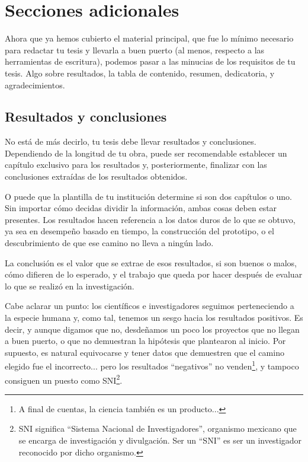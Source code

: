 \chapter{Secciones adicionales}
\label{cha:secciones_adicionales}



Ahora que ya hemos cubierto el material principal, que fue lo mínimo necesario para redactar tu tesis y llevarla a buen puerto (al menos, respecto a las herramientas de escritura), podemos pasar a las minucias de los requisitos de tu tesis. Algo sobre resultados, la tabla de contenido, resumen, dedicatoria, y agradecimientos.



\section{Resultados y conclusiones}
\label{sec:resultados_y_conclusiones}



No está de más decirlo, tu tesis debe llevar resultados y conclusiones. Dependiendo de la longitud de tu obra, puede ser recomendable establecer un capítulo exclusivo para los resultados y, posteriormente, finalizar con las conclusiones extraídas de los resultados obtenidos.

O puede que la plantilla de tu institución determine si son dos capítulos o uno. Sin importar cómo decidas dividir la información, ambas cosas deben estar presentes. Los resultados hacen referencia a los datos duros de lo que se obtuvo, ya sea en desempeño basado en tiempo, la construcción del prototipo, o el descubrimiento de que ese camino no lleva a ningún lado.

La conclusión es el valor que se extrae de esos resultados, si son buenos o malos, cómo difieren de lo esperado, y el trabajo que queda por hacer después de evaluar lo que se realizó en la investigación.

Cabe aclarar un punto: los científicos e investigadores seguimos perteneciendo a la especie humana y, como tal, tenemos un sesgo hacia los resultados positivos. Es decir, y aunque digamos que no, desdeñamos un poco los proyectos que no llegan a buen puerto, o que no demuestran la hipótesis que plantearon al inicio. Por supuesto, es natural equivocarse y tener datos que demuestren que el camino elegido fue el incorrecto... pero los resultados ``negativos'' no venden\footnote{A final de cuentas, la ciencia también es un producto...}, y tampoco consiguen un puesto como SNI\footnote{SNI significa ``Sistema Nacional de Investigadores'', organismo mexicano que se encarga de investigación y divulgación. Ser un ``SNI'' es ser un investigador reconocido por dicho organismo.}.

